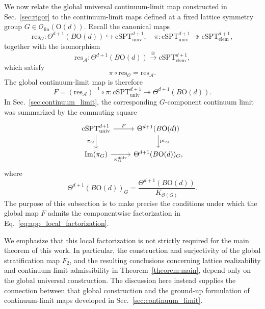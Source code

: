\documentclass[aps,prx,reprint,superscriptaddress,twocolumn,amsmath,amssymb,amsfonts, nofootinbib]{revtex4-2}
\newcommand{\csptu}{\mathrm{cSPT}^{d+1}_{\mathrm{univ}}}
\newcommand{\ofin}{\mathcal{O}_{\text{fin}}}
\newcommand{\res}{\text{res}}
\theoremstyle{apsstyle}
\begin{document}
We now relate the global universal continuum-limit map constructed in Sec.~\ref{sec:rigor} to the continuum-limit maps defined at a fixed lattice symmetry group $G\in\ofin(\mathrm{O}(d))$. Recall the canonical maps
\begin{equation*}
    \res_{\mathcal O}:
    \Theta^{d+1}(B\mathrm{O}(d))
    \hookrightarrow
    \csptu,
    \quad
    \pi:
    \csptu
    \twoheadrightarrow
    \mathrm{cSPT}^{d+1}_{\mathrm{elem}},
\end{equation*}
together with the isomorphism
\begin{equation*}
    \res_{\mathcal A}:
    \Theta^{d+1}(B\mathrm{O}(d))
    \xrightarrow{\;\cong\;}
    \mathrm{cSPT}^{d+1}_{\mathrm{elem}},
\end{equation*}
which satisfy
\begin{equation*}
    \pi\circ\res_{\mathcal O}=\res_{\mathcal A}.
\end{equation*}
The global continuum-limit map is therefore
\begin{equation*}
    F=(\res_{\mathcal A})^{-1}\circ\pi:
    \csptu
    \twoheadrightarrow
    \Theta^{d+1}(B\mathrm{O}(d)).
\end{equation*}
In Sec.~\ref{sec:continuum_limit}, the corresponding $G$-component continuum limit was summarized by the commuting square
\begin{equation}
\begin{tikzcd}
    \csptu
    \arrow[r, "F"]
    \arrow[d, "\pi_G"']
    &
    \Theta^{d+1}(B\mathrm{O}(d))
    \arrow[d, "\mathrm{pr}_G"]
    \\
    \mathrm{Im}(\pi_G)
    \arrow[r, "\kappa_G^{\mathrm{univ}}"']
    &
    \Theta^{d+1}(B\mathrm{O}(d))_G ,
\end{tikzcd}
\label{eq:app_local_factorization}
\end{equation}
where
\begin{equation*}
    \Theta^{d+1}(B\mathrm{O}(d))_G
    =
    \frac{\Theta^{d+1}(B\mathrm{O}(d))}
    {K_{\mathcal O(G)}}.
\end{equation*}
The purpose of this subsection is to make precise the conditions under which the global map $F$ admits the componentwise factorization in Eq.~\ref{eq:app_local_factorization}.

\bigskip 

We emphasize that this local factorization is not strictly required for the main theorem of this work. In particular, the construction and surjectivity of the global stratification map $F_2$, and the resulting conclusions concerning lattice realizability and continuum-limit admissibility in Theorem~\ref{theorem:main}, depend only on the global universal construction. The discussion here instead supplies the connection between that global construction and the ground-up formulation of continuum-limit maps developed in Sec.~\ref{sec:continuum_limit}.
\end{document}
